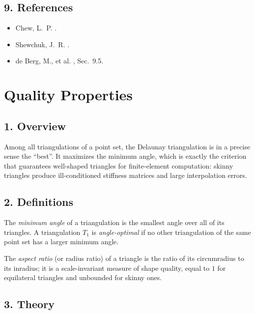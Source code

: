 \subsection{9. References}

\begin{itemize}
\item Chew, L.~P. \cite{chew1989}.
\item Shewchuk, J.~R. \cite{shewchuk1998}.
\item de Berg, M., et al. \cite{deberg2008}, Sec.~9.5.
\end{itemize}

\section{Quality Properties}
\label{sec:delaunay_quality}

\subsection{1. Overview}

Among all triangulations of a point set, the Delaunay triangulation is in a
precise sense the ``best''. It maximizes the minimum angle, which is exactly
the criterion that guarantees well-shaped triangles for finite-element
computation: skinny triangles produce ill-conditioned stiffness matrices and
large interpolation errors.

\subsection{2. Definitions}

\begin{definition}\label{def:min_angle}
The \emph{minimum angle} of a triangulation is the smallest angle over all of
its triangles. A triangulation $T_1$ is \emph{angle-optimal} if no other
triangulation of the same point set has a larger minimum angle.
\end{definition}

\begin{definition}\label{def:aspect_ratio}
The \emph{aspect ratio} (or radius ratio) of a triangle is the ratio of its
circumradius to its inradius; it is a scale-invariant measure of shape quality,
equal to $1$ for equilateral triangles and unbounded for skinny ones.
\end{definition}

\subsection{3. Theory}

